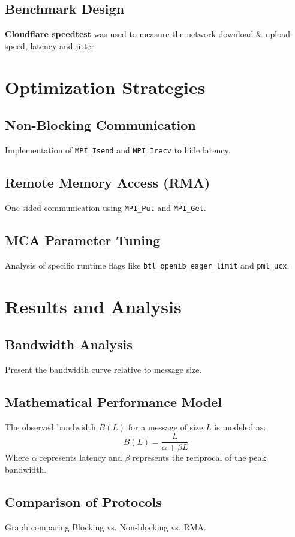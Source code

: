 \documentclass[11pt,a4paper]{article}
\begin{document}
	\subsection{Benchmark Design}
	\textbf{Cloudflare speedtest} was used to measure the network download \& upload speed, latency and jitter
	
	\section{Optimization Strategies}
	\label{sec:optimization}
	\subsection{Non-Blocking Communication}
	Implementation of \texttt{MPI\_Isend} and \texttt{MPI\_Irecv} to hide latency.
	\subsection{Remote Memory Access (RMA)}
	One-sided communication using \texttt{MPI\_Put} and \texttt{MPI\_Get}.
	\subsection{MCA Parameter Tuning}
	Analysis of specific runtime flags like \texttt{btl\_openib\_eager\_limit} and \texttt{pml\_ucx}.
	
	\section{Results and Analysis}
	\label{sec:results}
	\subsection{Bandwidth Analysis}
	Present the bandwidth curve relative to message size.
	\subsection{Mathematical Performance Model}
	The observed bandwidth $B(L)$ for a message of size $L$ is modeled as:
	$$B(L) = \frac{L}{\alpha + \beta L}$$
	Where $\alpha$ represents latency and $\beta$ represents the reciprocal of the peak bandwidth.
	\subsection{Comparison of Protocols}
	Graph comparing Blocking vs. Non-blocking vs. RMA.
	
\end{document}

